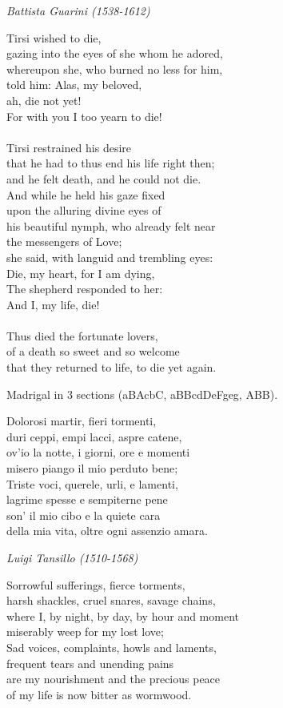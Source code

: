 \documentclass[12pt, twocolumn]{text-translation}
\begin{document}
{\raggedleft \textit{Battista Guarini (1538-1612)}\par}
\poemasterisks
Tirsi wished to die, \\
gazing into the eyes of she whom he adored, \\
whereupon she, who burned no less for him, \\
told him: Alas, my beloved, \\
ah, die not yet! \\
For with you I too yearn to die! \\
 \\
Tirsi restrained his desire \\
that he had to thus end his life right then; \\
and he felt death, and he could not die. \\
And while he held his gaze fixed \\
upon the alluring divine eyes of \\
his beautiful nymph, who already felt near \\
the messengers of Love; \\
she said, with languid and trembling eyes: \\
Die, my heart, for I am dying, \\
The shepherd responded to her: \\
And I, my life, die! \\
 \\
Thus died the fortunate lovers, \\
of a death so sweet and so welcome \\
that they returned to life, to die yet again. 

Madrigal in 3 sections (aBAcbC, aBBcdDeFgeg, ABB).

Dolorosi martir, fieri tormenti,  \\
duri ceppi, empi lacci, aspre catene,  \\
ov'io la notte, i giorni, ore e momenti  \\
misero piango il mio perduto bene;  \\
Triste voci, querele, urli, e lamenti,  \\
lagrime spesse e sempiterne pene  \\
son' il mio cibo e la quiete cara  \\
della mia vita, oltre ogni assenzio amara. 

{\raggedleft \textit{Luigi Tansillo (1510-1568)}\par}
\poemasterisks
Sorrowful sufferings, fierce torments,  \\
harsh shackles, cruel snares, savage chains,  \\
where I, by night, by day, by hour and moment  \\
miserably weep for my lost love;  \\
Sad voices, complaints, howls and laments,  \\
frequent tears and unending pains  \\
are my nourishment and the precious peace  \\
of my life is now bitter as wormwood. 
\end{document}

